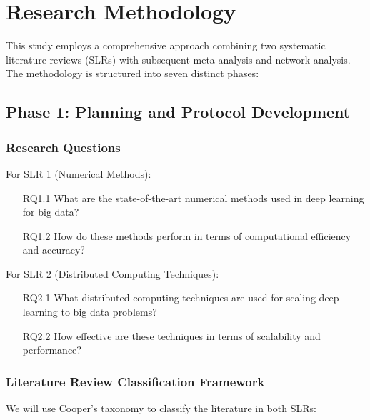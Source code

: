 \documentclass[a4paper,12pt]{article}
\begin{document}
\section{Research Methodology}

This study employs a comprehensive approach combining two systematic literature reviews (SLRs) with subsequent meta-analysis and network analysis. The methodology is structured into seven distinct phases:

\subsection{Phase 1: Planning and Protocol Development}

\subsubsection{Research Questions}
For SLR 1 (Numerical Methods):
\begin{enumerate}
    \item[RQ1.1] What are the state-of-the-art numerical methods used in deep learning for big data?
    \item[RQ1.2] How do these methods perform in terms of computational efficiency and accuracy?
\end{enumerate}

For SLR 2 (Distributed Computing Techniques):
\begin{enumerate}
    \item[RQ2.1] What distributed computing techniques are used for scaling deep learning to big data problems?
    \item[RQ2.2] How effective are these techniques in terms of scalability and performance?
\end{enumerate}

\subsubsection{Literature Review Classification Framework}
We will use Cooper's taxonomy \citep{cooper1988} to classify the literature in both SLRs:
\end{document}
